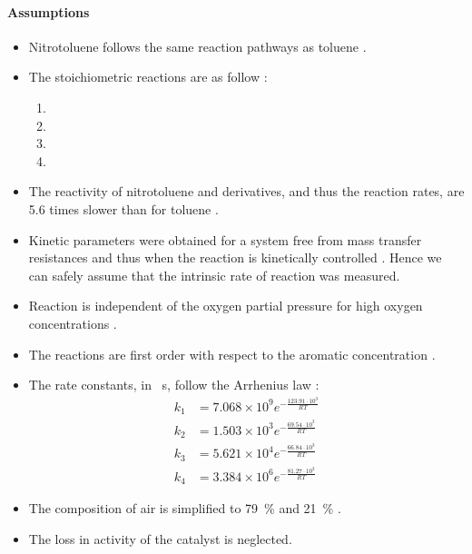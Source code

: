 \paragraph{Assumptions}
\begin{itemize}
    \item Nitrotoluene follows the same reaction pathways as toluene \cite{wendt_reaction_1986}.
    \item The stoichiometric reactions are as follow \cite{hoorn_modelling_2005}:
    \begin{enumerate}
        \item {}
        \item {}
        \item {}
        \item {}
    \end{enumerate}
    \item The reactivity of nitrotoluene and derivatives, and thus the reaction rates, are 5.6 times slower than for toluene \cite{partenheimer_methodology_1995}.
    \item Kinetic parameters were obtained for a system free from mass transfer resistances and thus when the reaction is kinetically controlled \cite{chandalia_kinetics_1999}. Hence we can safely assume that the intrinsic rate of reaction was measured.
    \item Reaction is independent of the oxygen partial pressure for high oxygen concentrations \cite{tan_kinetic_2010}.
    \item The reactions are first order with respect to the aromatic concentration \cite{chandalia_kinetics_1999}.
    \item The rate constants, in \si{\per\s}, follow the Arrhenius law \cite{tan_kinetic_2010}:
        \begin{align}
            k_1&=7.068 \times 10^9 e^{-\frac{123.91\cdot 10^{3}}{RT}}\\
            k_2&=1.503 \times 10^3 e^{-\frac{69.54 \cdot 10^{3}}{RT}}\\
            k_3&=5.621 \times 10^4 e^{-\frac{66.84 \cdot 10^{3}}{RT}}\\
            k_4&=3.384 \times 10^6 e^{-\frac{81.27 \cdot 10^{3}}{RT}}
        \end{align}    
    \item The composition of air is simplified to \SI{79}{\percent}  and \SI{21}{\percent} .
    \item The loss in activity of the catalyst is neglected.
\end{itemize}

